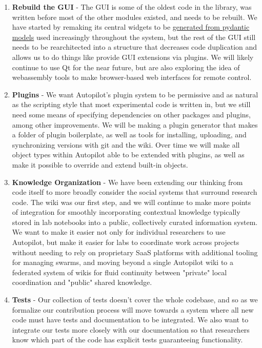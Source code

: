\begin{enumerate}[ref=\thechapter.\arabic*]
    \item \label{future:gui} \textbf{Rebuild the GUI} - The GUI is some of the oldest code in the library, was written before most of the other modules existed, and needs to be rebuilt. We have started by remaking its central widgets to be \href{https://github.com/auto-pi-lot/autopilot/blob/f0d20fbf3b33f832cf31136ab7d16abe01a3e924/autopilot/gui/widgets/model.py}{generated from pydantic models} used increasingly throughout the system, but the rest of the GUI still needs to be rearchitected into a structure that decreases code duplication and allows us to do things like provide GUI extensions via plugins. We will likely continue to use Qt for the near future, but are also exploring the idea of webassembly tools to make browser-based web interfaces for remote control.
    \item \label{future:plugins} \textbf{Plugins} - We want Autopilot's plugin system to be permissive and as natural as the scripting style that most experimental code is written in, but we still need some means of specifying dependencies on other packages and plugins, among other improvements. We will be making a plugin generator that makes a folder of plugin boilerplate, as well as tools for installing, uploading, and synchronizing versions with git and the wiki. Over time we will make all object types within Autopilot able to be extended with plugins, as well as make it possible to override and extend built-in objects.
    \item \label{future:knowledge} \textbf{Knowledge Organization} - We have been extending our thinking from code itself to more broadly consider the social systems that surround research code. The wiki was our first step, and we will continue to make more points of integration for smoothly incorporating contextual knowledge typically stored in lab notebooks into a public, collectively curated information system. We want to make it easier not only for individual researchers to use Autopilot, but make it easier for labs to coordinate work across projects without needing to rely on proprietary SaaS platforms with additional tooling for managing swarms, and moving beyond a single Autopilot wiki to a federated system of wikis for fluid continuity between "private" local coordination and "public" shared knowledge.
    \item \label{future:tests}\textbf{Tests} - Our collection of tests doesn't cover the whole codebase, and so as we formalize our contribution process will move towards a system where all new code must have tests and documentation to be integrated. We also want to integrate our tests more closely with our documentation so that researchers know which part of the code has explicit tests guaranteeing functionality.

\end{enumerate}
